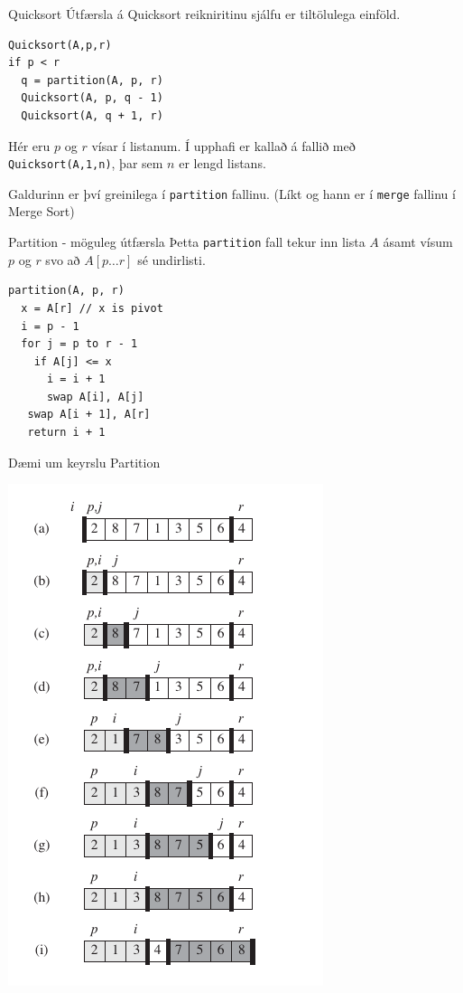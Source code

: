 \documentclass{beamer}
\begin{document}
\begin{frame}[fragile]{Quicksort}
Útfærsla á Quicksort reikniritinu sjálfu er tiltölulega einföld.
\begin{verbatim}
Quicksort(A,p,r)
if p < r
  q = partition(A, p, r)
  Quicksort(A, p, q - 1)
  Quicksort(A, q + 1, r)
\end{verbatim}
Hér eru $p$ og $r$ vísar í listanum. Í upphafi er kallað á fallið með \verb|Quicksort(A,1,n)|, þar sem $n$ er lengd listans.

Galdurinn er því greinilega í \verb|partition| fallinu. (Líkt og hann er í \verb|merge| fallinu í Merge Sort)
\end{frame}

\begin{frame}[fragile]{Partition - möguleg útfærsla}
Þetta \verb|partition| fall tekur inn lista $A$ ásamt vísum $p$ og $r$ svo að $A[p \ldots r]$ sé undirlisti.
\begin{verbatim}
partition(A, p, r)
  x = A[r] // x is pivot
  i = p - 1
  for j = p to r - 1
    if A[j] <= x
      i = i + 1
      swap A[i], A[j]
   swap A[i + 1], A[r]
   return i + 1
\end{verbatim}
\end{frame}

\begin{frame}{Dæmi um keyrslu Partition}
\begin{center}
\includegraphics[height=0.9\textheight]{Pics/Quicksort}
\end{center}
\end{frame}
\end{document}
